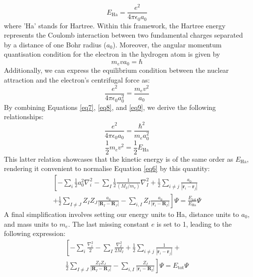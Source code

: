 \begin{equation}
  \label{eq7}
  E_{\text{Ha}} = \frac{e^2}{4 \pi \epsilon_0 a_0}
\end{equation}
where 'Ha' stands for Hartree. Within this framework, the Hartree energy represents the Coulomb interaction between two fundamental charges separated by a distance of one Bohr radius ($a_0$). Moreover, the angular momentum quantisation condition for the electron in the hydrogen atom is given by
\begin{equation}
  \label{eq8}
  m_e v a_0 = \hbar
\end{equation}
Additionally, we can express the equilibrium condition between the nuclear attraction and the electron's centrifugal force as:
\begin{equation}
  \label{eq9}
  \frac{e^2}{4 \pi \epsilon_0 a_0^2} = \frac{m_e v^2}{a_0}
\end{equation}
By combining Equations \ref{eq7}, \ref{eq8}, and \ref{eq9}, we derive the 
following relationships:
\begin{equation}
  \label{eq10}
  \frac{e^2}{4 \pi \epsilon_0 a_0} = \frac{\hbar^2}{m_e a_0^2}
\end{equation}
\begin{equation}
  \label{eq11}
  \frac{1}{2} m_e v^2 = \frac{1}{2}E_{\text{Ha}}
\end{equation}
This latter relation showcases that the kinetic energy is of the same order as $E_\text{Ha}$, rendering it convenient to normalise Equation \ref{eq6} by this quantity:
\begin{equation}
  \label{eq12}
  \begin{split}
    \left[
      -\sum_i \frac{1}{2}a_0^2 \nabla_i^2 
      - \sum_I \frac{1}{2} \frac{1}{(M_I/m_e)} \nabla_I^2 
      + \frac{1}{2} \sum_{i\neq j} \frac{a_0}{|\mathbf{r}_i - \mathbf{r}_j|}\right. \\
      \left. +  \frac{1}{2} \sum_{I\neq J} Z_I Z_J \frac{a_0}{|\mathbf{R}_I - \mathbf{R}_J|} 
      - \sum_{i, I} Z_I \frac{a_0}{|\mathbf{r}_i - \mathbf{R}_I|}
    \right]\Psi = \frac{E_{\text{tot}}}{E_{\text{Ha}}} \Psi
  \end{split}
\end{equation}
A final simplification involves setting our energy units to Ha, distance units to $a_0$, and mass units to $m_e$. The last missing constant $e$ is set to 1, leading to the following expression: 
\begin{equation}
  \label{eq13}
  \begin{split}
    \left[
      -\sum_i \frac{\nabla_i^2}{2}
      - \sum_I \frac{\nabla_I^2}{2 M_I} 
      + \frac{1}{2} \sum_{i\neq j} \frac{1}{|\mathbf{r}_i - \mathbf{r}_j|} + \right. \\
      \left. \frac{1}{2} \sum_{I\neq J} \frac{Z_I Z_J} {|\mathbf{R}_I - \mathbf{R}_J|} 
      - \sum_{i, I} \frac{Z_I}{|\mathbf{r}_i - \mathbf{R}_I|}
    \right]\Psi = E_{\text{tot}} \Psi
  \end{split}
\end{equation}

